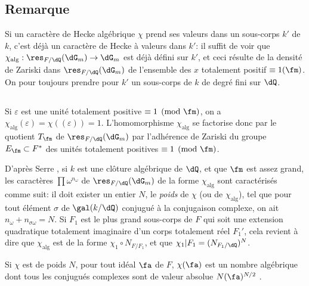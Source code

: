 \subsection{Remarque}\label{VI:5-4}

Si un caractère de Hecke algébrique $\chi$ prend ses valeurs dans un 
sous-corps $k'$ de $k$, c'est déjà un caractère de Hecke à valeurs dans 
$k'$: il suffit de voir que $\chi_\text{alg}:\res_{F/\dQ}(\dG_m) \to \dG_m$ 
est déjà défini sur $k'$, et ceci résulte de la densité de Zariski 
dans $\res_{F/\dQ}(\dG_m)$ de l'ensemble des $x$ totalement positif 
$\equiv 1(\fm)$. On pour toujours prendre pour $k'$ un sous-corps de $k$ de 
degré fini sur $\dQ$. 





\subsection{}\label{VI:5-5}

Si $\varepsilon$ est une unité totalement positive $\equiv 1\pmod\fm$, on a 
$\chi_\text{alg}(\varepsilon) = \chi((\varepsilon)) = 1$. L'homomorphisme 
$\chi_\text{alg}$ se factorise donc par le quotient $T_\fm$ de 
$\res_{F/\dQ}(\dG_m)$ par l'adhérence de Zariski du groupe 
$E_\fm\subset F^\ast$ des unités totalement positives $\equiv 1\pmod\fm$. 

D'après Serre \cite[II.3]{se68}, si $k$ est une clôture algébrique de 
$\dQ$, et que $\fm$ est assez grand, les caractères $\prod \omega^{n_\omega}$ 
de $\res_{F/\dQ}(\dG_m)$ de la forme $\chi_\text{alg}$ sont caractérisés 
comme suit: il doit exister un entier $N$, le \emph{poids} de $\chi$ (ou de 
$\chi_\text{alg}$), tel que pour tout élément $\sigma$ de $\gal(k/\dQ)$ 
conjugué à la conjugaison complexe, on ait $n_\omega+n_{\sigma \omega}=N$. Si 
$F_1$ est le plus grand sous-corps de $F$ qui soit une extension quadratique 
totalement imaginaire d'un corps totalement réel $F_1'$, cela revient à 
dire que $\chi_\text{alg}$ est de la forme $\chi_1\circ N_{F/F_1}$, et que 
$\chi_1|F_1=(N_{F_1/\dQ})^N$. 

Si $\chi$ est de poids $N$, pour tout idéal $\fa$ de $F$, $\chi(\fa)$ est un 
nombre algébrique dont tous les conjugués complexes sont de valeur absolue 
$N(\fa)^{N/2}$ \cite[II.3 prop.2]{se68}. 





\subsection{}\label{VI:5-6}

